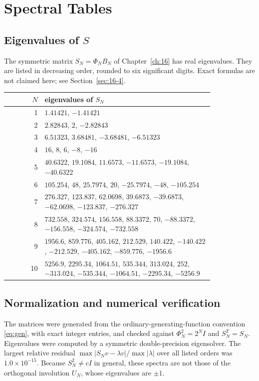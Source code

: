 \chapter{Spectral Tables}
\label{app:spectral-tables}
\section{Eigenvalues of $S$}
The symmetric matrix $S_N=\Phi_NB_N$ of Chapter~\ref{ch:16} has real
eigenvalues. They are listed in decreasing order, rounded to six
significant digits. Exact formulas are not claimed here; see
Section~\ref{sec:16-4}.
\begin{center}
\small
\begin{tabular}{r p{0.82\linewidth}}
$N$ & eigenvalues of $S_N$\\\hline
1 & $1.41421$, $-1.41421$ \\
2 & $2.82843$, $2$, $-2.82843$ \\
3 & $6.51323$, $3.68481$, $-3.68481$, $-6.51323$ \\
4 & $16$, $8$, $6$, $-8$, $-16$ \\
5 & $40.6322$, $19.1084$, $11.6573$, $-11.6573$, $-19.1084$, $-40.6322$ \\
6 & $105.254$, $48$, $25.7974$, $20$, $-25.7974$, $-48$, $-105.254$ \\
7 & $276.327$, $123.837$, $62.0698$, $39.6873$, $-39.6873$, $-62.0698$, $-123.837$, $-276.327$ \\
8 & $732.558$, $324.574$, $156.558$, $88.3372$, $70$, $-88.3372$, $-156.558$, $-324.574$, $-732.558$ \\
9 & $1956.6$, $859.776$, $405.162$, $212.529$, $140.422$, $-140.422$, $-212.529$, $-405.162$, $-859.776$, $-1956.6$ \\
10 & $5256.9$, $2295.34$, $1064.51$, $535.344$, $313.024$, $252$, $-313.024$, $-535.344$, $-1064.51$, $-2295.34$, $-5256.9$ \\
\end{tabular}
\end{center}

\section{Normalization and numerical verification}
The matrices were generated from the ordinary-generating-function
convention \eqref{eq:gen}, with exact integer entries, and checked against
$\Phi_N^2=2^NI$ and $S_N^T=S_N$. Eigenvalues were computed by a symmetric
double-precision eigensolver. The largest relative residual
$\max|S_Nv-\lambda v|/\max|\lambda|$ over all listed orders was
$1.0\times10^{-15}$.
Because $S_N^2\ne cI$ in general, these spectra are not those of the
orthogonal involution $U_N$, whose eigenvalues are $\pm1$.
